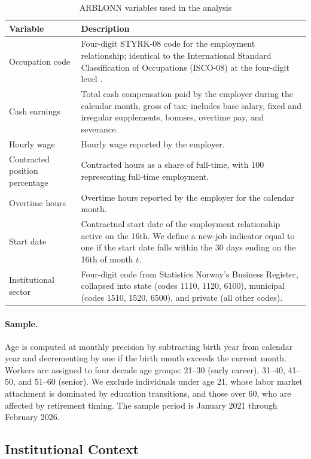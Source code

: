 \begin{table}[htbp]
\centering
\caption{ARBLONN variables used in the analysis}
\label{tab:arblonn_variables}
\footnotesize
\begin{tabular}{p{4.2cm}p{10cm}}
\toprule
Variable & Description \\
\midrule
Occupation code & Four-digit STYRK-08 code for the employment relationship; identical to the International Standard Classification of Occupations (ISCO-08) at the four-digit level \citep{ssb2011styrk}. \\[4pt]
Cash earnings & Total cash compensation paid by the employer during the calendar month, gross of tax; includes base salary, fixed and irregular supplements, bonuses, overtime pay, and severance. \\[4pt]
Hourly wage & Hourly wage reported by the employer. \\[4pt]
Contracted position percentage & Contracted hours as a share of full-time, with 100 representing full-time employment. \\[4pt]
Overtime hours & Overtime hours reported by the employer for the calendar month. \\[4pt]
Start date & Contractual start date of the employment relationship active on the 16th. We define a new-job indicator equal to one if the start date falls within the 30 days ending on the 16th of month $t$. \\[4pt]
Institutional sector & Four-digit code from Statistics Norway's Business Register, collapsed into state (codes 1110, 1120, 6100), municipal (codes 1510, 1520, 6500), and private (all other codes). \\
\bottomrule
\end{tabular}
\end{table}

\paragraph{Sample.}
Age is computed at monthly precision by subtracting birth year from calendar year and decrementing by one if the birth month exceeds the current month. Workers are assigned to four decade age groups: 21--30 (early career), 31--40, 41--50, and 51--60 (senior). We exclude individuals under age 21, whose labor market attachment is dominated by education transitions, and those over 60, who are affected by retirement timing. The sample period is January 2021 through February 2026.


\subsection{Institutional Context}\label{sec:data:institutions}

